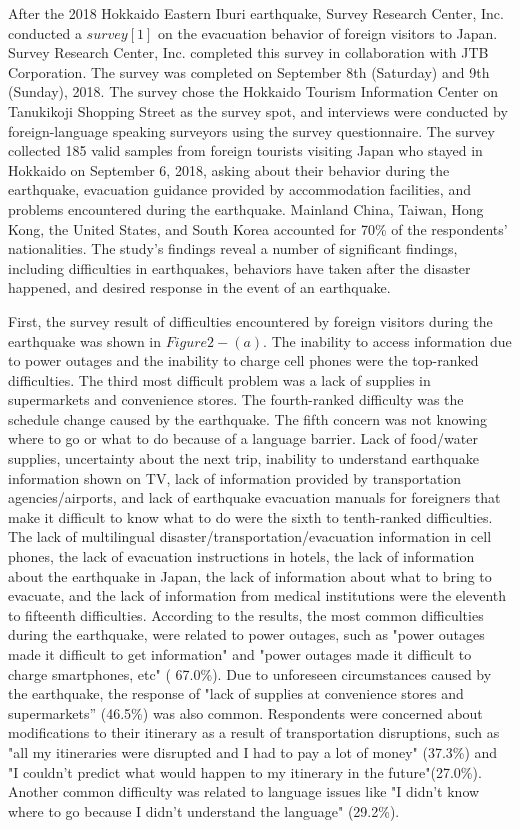 After the 2018 Hokkaido Eastern Iburi earthquake, Survey Research Center, Inc. conducted a $survey [1]$ on the evacuation behavior of foreign visitors to Japan. Survey Research Center, Inc. completed this survey in collaboration with JTB Corporation. The survey was completed on September 8th (Saturday) and 9th (Sunday), 2018. The survey chose the Hokkaido Tourism Information Center on Tanukikoji Shopping Street as the survey spot, and interviews were conducted by foreign-language speaking surveyors using the survey questionnaire. The survey collected 185 valid samples from foreign tourists visiting Japan who stayed in Hokkaido on September 6, 2018, asking about their behavior during the earthquake, evacuation guidance provided by accommodation facilities, and problems encountered during the earthquake. Mainland China, Taiwan, Hong Kong, the United States, and South Korea accounted for 70\% of the respondents' nationalities. The study's findings reveal a number of significant findings, including difficulties in earthquakes, behaviors have taken after the disaster happened, and desired response in the event of an earthquake.

First, the survey result of difficulties encountered by foreign visitors during the earthquake was shown in $Figure 2 - (a)$. The inability to access information due to power outages and the inability to charge cell phones were the top-ranked difficulties. The third most difficult problem was a lack of supplies in supermarkets and convenience stores. The fourth-ranked difficulty was the schedule change caused by the earthquake. The fifth concern was not knowing where to go or what to do because of a language barrier. Lack of food/water supplies, uncertainty about the next trip, inability to understand earthquake information shown on TV, lack of information provided by transportation agencies/airports, and lack of earthquake evacuation manuals for foreigners that make it difficult to know what to do were the sixth to tenth-ranked difficulties. The lack of multilingual disaster/transportation/evacuation information in cell phones, the lack of evacuation instructions in hotels, the lack of information about the earthquake in Japan, the lack of information about what to bring to evacuate, and the lack of information from medical institutions were the eleventh to fifteenth difficulties. According to the results, the most common difficulties during the earthquake, were related to power outages, such as "power outages made it difficult to get information" and "power outages made it difficult to charge smartphones, etc" ( 67.0\%). Due to unforeseen circumstances caused by the earthquake, the response of "lack of supplies at convenience stores and supermarkets”  (46.5\%) was also common. Respondents were concerned about modifications to their itinerary as a result of transportation disruptions, such as "all my itineraries were disrupted and I had to pay a lot of money" (37.3\%) and "I couldn't predict what would happen to my itinerary in the future"(27.0\%). Another common difficulty was related to language issues like "I didn't know where to go because I didn't understand the language" (29.2\%).


